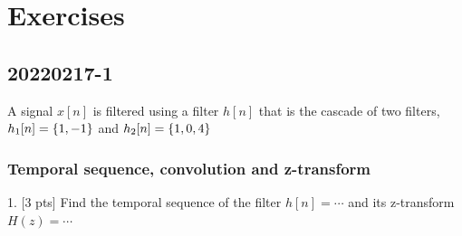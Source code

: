 
\section{Exercises}

\subsection{20220217-1}
    A signal $x[n]$ is filtered using a filter $h[n]$ that is the cascade of two filters, $h_1[n]=\{{1,-1}\}$ and $h_2[n]=\{{1,0,4}\}$

    \subsubsection{Temporal sequence, convolution and z-transform}
    1. [3 pts] Find the temporal sequence of the filter $h[n]=\cdots$ and its z-transform $H(z)=\cdots$


